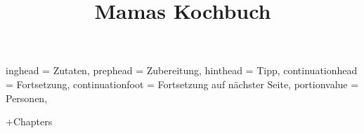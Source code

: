 \documentclass[%
a4paper,
11pt
]{article}
\begin{document}
\title{Mamas Kochbuch}

\maketitle

\setHeadlines
{%
    inghead = Zutaten,
    prephead = Zubereitung,
    hinthead = Tipp,
    continuationhead = Fortsetzung,
    continuationfoot = Fortsetzung auf n\"achster Seite,
    portionvalue = Personen,
}


\tableofcontents

\vspace{5em}
\newpage

+Chapters
\end{document}
